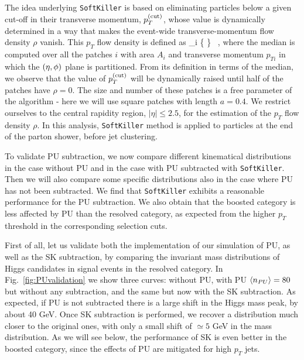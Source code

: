 The idea underlying {\tt SoftKiller} is based on eliminating particles
below a given cut-off in their transverse momentum, $p_T^{\rm (cut)}$, whose
value is dynamically determined in a way that makes the event-wide
transverse-momentum flow density $\rho$ vanish.
%
This $p_T$ flow density is defined as
\be
\rho{}_i \Bigg\{ \Bigg\} \, ,
\ee
where the median is computed over all the patches $i$ with area
$A_i$ and transverse momentum $p_{Ti}$ in which the $\left( \eta,\phi\right)$ plane
is partitioned.
%
From its definition in terms of the median,
we observe that the value of $p_T^{(\rm cut)}$
will be dynamically raised until half of the patches have $\rho=0$.
%
The size and number of these patches is a free parameter of the algorithm -
here we will use square patches with length $a=0.4$.
%
We restrict ourselves to the central rapidity region,
$|\eta| \le 2.5$, for the estimation of the
$p_T$ flow density $\rho$.
%
In this analysis, {\tt SoftKiller} method is applied
to particles at the end of the parton shower, before
jet clustering.

To validate PU subtraction,
we now compare different kinematical distributions
in the case without PU and in the case
with PU subtracted with {\tt SoftKiller}.
%
Then we will also compare some specific distributions
also in the case where PU has not been subtracted.
%
We find that
{\tt SoftKiller} exhibits a reasonable
performance for the PU subtraction.
%
We  also obtain that the boosted category is less affected
by PU than the resolved category, as expected from the higher
$p_T$ threshold in the corresponding selection cuts.


First of all, let us validate both the implementation of our
simulation of PU, as well as the SK subtraction, by comparing the
invariant mass distributions of Higgs candidates in signal
events in the resolved category.
%
In Fig.~\ref{fig:PUvalidation} we show three curves: without PU,
with PU $\left\langle n_{PU}\right\rangle=80$ but without any subtraction, and the
same but now with the SK subtraction.
%
As expected, if PU is not subtracted there is a large shift in the Higgs mass
peak, by about 40 GeV.
%
Once SK subtraction is performed, we recover a distribution much closer
to the original ones, with only a small shift of $\simeq 5$ GeV in the mass
distribution.
%
As we will see below, the performance of SK is even better in the boosted category,
since the effects of PU are mitigated for high $p_T$ jets.

